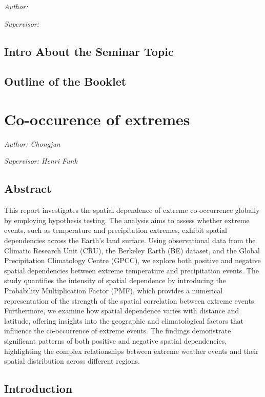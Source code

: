 \documentclass[
]{krantz}
\begin{document}
\emph{Author: }

\emph{Supervisor: }

\section{Intro About the Seminar Topic}\label{intro-about-the-seminar-topic-1}

\section{Outline of the Booklet}\label{outline-of-the-booklet-1}

\chapter{Co-occurence of extremes}\label{co-occurence-of-extremes}

\emph{Author: Chongjun }

\emph{Supervisor: Henri Funk}

\section{Abstract}\label{abstract-4}

This report investigates the spatial dependence of extreme co-occurrence globally by employing hypothesis testing. The analysis aims to assess whether extreme events, such as temperature and precipitation extremes, exhibit spatial dependencies across the Earth's land surface. Using observational data from the Climatic Research Unit (CRU), the Berkeley Earth (BE) dataset, and the Global Precipitation Climatology Centre (GPCC), we explore both positive and negative spatial dependencies between extreme temperature and precipitation events. The study quantifies the intensity of spatial dependence by introducing the Probability Multiplication Factor (PMF), which provides a numerical representation of the strength of the spatial correlation between extreme events. Furthermore, we examine how spatial dependence varies with distance and latitude, offering insights into the geographic and climatological factors that influence the co-occurrence of extreme events. The findings demonstrate significant patterns of both positive and negative spatial dependencies, highlighting the complex relationships between extreme weather events and their spatial distribution across different regions.

\section{Introduction}\label{introduction-3}
\end{document}
